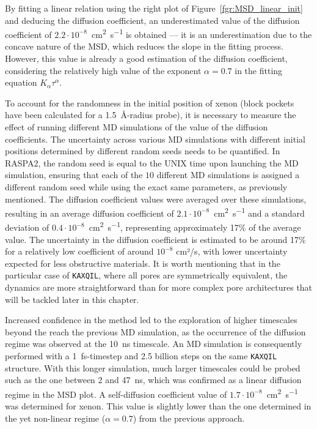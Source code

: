 \documentclass[main]{subfiles}
\begin{document}
By fitting a linear relation using the right plot of Figure~\ref{fgr:MSD_linear_init} and deducing the diffusion coefficient, an underestimated value of the diffusion coefficient of $2.2\cdot10^{-8}$~\si{\square\cm\per\s} is obtained --- it is an underestimation due to the concave nature of the MSD, which reduces the slope in the fitting process. However, this value is already a good estimation of the diffusion coefficient, considering the relatively high value of the exponent $\alpha=0.7$ in the fitting equation $K_\alpha\tau^\alpha$.

To account for the randomness in the initial position of xenon (block pockets have been calculated for a \SI{1.5}{\angstrom}-radius probe), it is necessary to measure the effect of running different MD simulations of the value of the diffusion coefficients. The uncertainty across various MD simulations with different initial positions determined by different random seeds needs to be quantified. In RASPA2, the random seed is equal to the UNIX time upon launching the MD simulation, ensuring that each of the $10$ different MD simulations is assigned a different random seed while using the exact same parameters, as previously mentioned. The diffusion coefficient values were averaged over these simulations, resulting in an average diffusion coefficient of $2.1\cdot10^{-8}$~\si{\square\cm\per\s} and a standard deviation of $0.4\cdot10^{-8}$~\si{\square\cm\per\s}, representing approximately {17\%} of the average value. The uncertainty in the diffusion coefficient is estimated to be around {17\%} for a relatively low coefficient of around $10^{-8}$ cm²/s, with lower uncertainty expected for less obstructive materials. It is worth mentioning that in the particular case of \texttt{KAXQIL}, where all pores are symmetrically equivalent, the dynamics are more straightforward than for more complex pore architectures that will be tackled later in this chapter.

Increased confidence in the method led to the exploration of higher timescales beyond the reach the previous MD simulation, as the occurrence of the diffusion regime was observed at the \SI{10}{\ns} timescale. An MD simulation is consequently performed with a 1~\si{\fs}-timestep and 2.5 billion steps on the same \texttt{KAXQIL} structure. With this longer simulation, much larger timescales could be probed such as the one between {2} and {47}~\si{\ns}, which was confirmed as a linear diffusion regime in the MSD plot. A self-diffusion coefficient value of $1.7\cdot10^{-8}$~\si{\square\cm\per\s} was determined for xenon. This value is slightly lower than the one determined in the yet non-linear regime ($\alpha=0.7$) from the previous approach.
\end{document}
